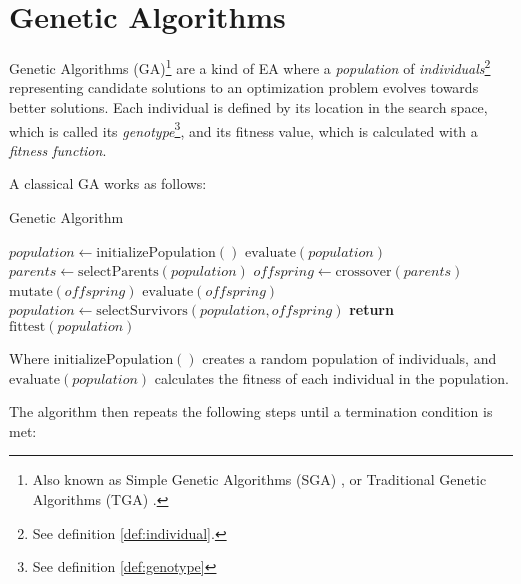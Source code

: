 \section{Genetic Algorithms}
\label{sec:genetic_algorithms}
  Genetic Algorithms (GA)\footnote{
    Also known as Simple Genetic Algorithms (SGA) 
    \autocite{yuIntroductionEvolutionaryAlgorithms2010}, or Traditional Genetic Algorithms (TGA)
    \autocite{shiffmanNatureCode2012}.
  } \autocite{hollandAdaptationNaturalArtificial1992a,kozaGeneticProgrammingProgramming1992a,yuIntroductionEvolutionaryAlgorithms2010,shiffmanNatureCode2012}
  are a kind of EA where a \emph{population} of \emph{individuals}\footnote{
    See definition \ref{def:individual}.
  } representing candidate solutions to an optimization problem evolves towards better solutions.
  Each individual is defined by its location in the search space, which is called its
  \emph{genotype}\footnote{See definition \ref{def:genotype}}, and its fitness value, which is
  calculated with a \emph{fitness function}.

  A classical GA works as follows:

  \begin{algorithm}
    \caption{Genetic Algorithm}\label{alg:genetic_algorithm}
    \begin{algorithmic}
      \State \(\mathit{population} \gets \mathrm{initializePopulation()}\)
      \State \(\mathrm{evaluate}(\mathit{population})\)
      \Repeat
        \State \(\mathit{parents} \gets \mathrm{selectParents}(\mathit{population})\)
        \State \(\mathit{offspring} \gets \mathrm{crossover}(\mathit{parents})\)
        \State \(\mathrm{mutate}(\mathit{offspring})\)
        \State \(\mathrm{evaluate}(\mathit{offspring})\)
        \State \(\mathit{population} \gets \mathrm{selectSurvivors}(\mathit{population},
          \mathit{offspring})\)
      \State \textbf{return} \(\mathrm{fittest}(\mathit{population})\)
    \end{algorithmic}
  \end{algorithm}

  Where \(\mathrm{initializePopulation()}\) creates a random population of individuals, and
  \(\mathrm{evaluate}(\mathit{population})\) calculates the fitness of each individual in the
  population.

  The algorithm then repeats the following steps until a termination condition is met:

